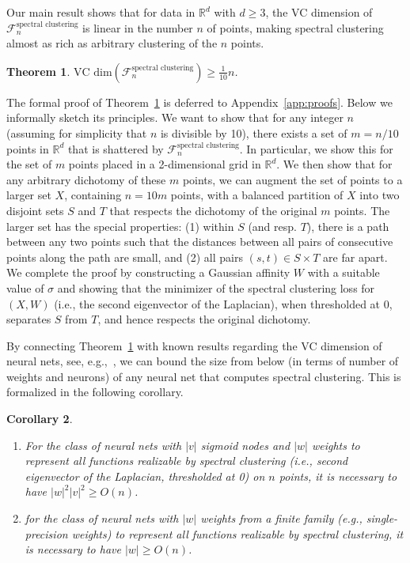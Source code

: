 \documentclass{article} %
\newtheorem{theorem}{Theorem}[section]
\newtheorem{corollary}[theorem]{Corollary}
\begin{document}
Our main result shows that for data in $\mathbb{R}^d$ with $d \ge 3$, the VC dimension of $\mathcal{F}^\text{spectral clustering}_n$ is linear in the number $n$ of points, making spectral clustering almost as rich as arbitrary clustering of the $n$ points.
\begin{theorem} \label{thm:vc}
$\text{VC dim}(\mathcal{F}^\text{spectral clustering}_n) \ge\frac{1}{10}n$.
\end{theorem}
The formal proof of Theorem~\ref{thm:vc} is deferred to Appendix~\ref{app:proofs}. Below we informally sketch its principles.
We want to show that for any integer $n$ (assuming for simplicity that $n$ is divisible by 10), there exists a set of $m=n/10$ points in $\mathbb{R}^d$ that is shattered by $\mathcal{F}^\text{spectral clustering}_n$.
In particular, we show this for the set of $m$ points placed in a 2-dimensional grid in $\mathbb{R}^d$. We then show that for any arbitrary dichotomy of these $m$ points, we can augment the set of points to a larger set $X$, containing $n=10m$ points, with a balanced partition of $X$ into two disjoint sets $S$ and $T$ that respects the dichotomy of the original $m$ points. The larger set has the special properties: (1) within $S$ (and resp. $T$), there is a path between any two points such that the distances between all pairs of consecutive points along the path are small, and (2) all pairs $(s,t) \in S \times T$ are far apart.
We complete the proof by constructing a Gaussian affinity $W$ with a suitable value of $\sigma$ and showing that the minimizer of the spectral clustering loss for $(X,W)$ (i.e., the second eigenvector of the Laplacian), when thresholded at 0, separates $S$ from $T$, and hence respects the original dichotomy.


By connecting Theorem~\ref{thm:vc} with known results regarding the VC dimension of neural nets, see, e.g.,~\citep{shalev2014understanding}, we can bound the size from below (in terms of number of weights and neurons) of any neural net that computes spectral clustering. This is formalized in the following corollary.

\begin{corollary}\label{cor:vc}~\\[-0.5cm]
\begin{enumerate}
\item For the class of neural nets with $|v|$ sigmoid nodes and $|w|$ weights to  represent all functions realizable by spectral clustering (i.e., second eigenvector of the Laplacian, thresholded at 0) on $n$ points, it is necessary to have $|w|^2|v|^2 \ge O(n)$.
\item for the class of neural nets with $|w|$ weights from a finite family (e.g., single-precision weights) to  represent all functions realizable by spectral clustering, it is necessary to have $|w| \ge O(n)$.
\end{enumerate}
\end{corollary}
\end{document}
